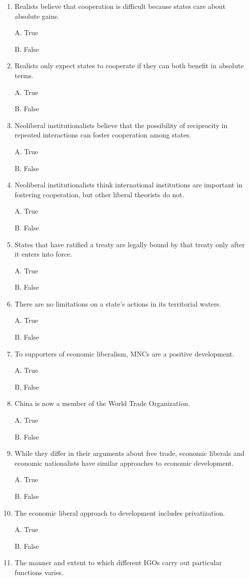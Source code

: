 \documentclass[
]{book}
\begin{document}
\begin{enumerate}
\def\labelenumi{\arabic{enumi}.}
\item
  Realists believe that cooperation is difficult because states care about absolute gains.

  A. True

  B. False
\item
  Realists only expect states to cooperate if they can both benefit in absolute terms.

  A. True

  B. False
\item
  Neoliberal institutionalists believe that the possibility of reciprocity in repeated interactions can foster cooperation among states.

  A. True

  B. False
\item
  Neoliberal institutionalists think international institutions are important in fostering cooperation, but other liberal theorists do not.

  A. True

  B. False
\item
  States that have ratified a treaty are legally bound by that treaty only after it enters into force.

  A. True

  B. False
\item
  There are no limitations on a state's actions in its territorial waters.

  A. True

  B. False
\item
  To supporters of economic liberalism, MNCs are a positive development.

  A. True

  B. False
\item
  China is now a member of the World Trade Organization.

  A. True

  B. False
\item
  While they differ in their arguments about free trade, economic liberals and economic nationalists have similar approaches to economic development.

  A. True

  B. False
\item
  The economic liberal approach to development includes privatization.

  A. True

  B. False
\item
  The manner and extent to which different IGOs carry out particular functions varies.


\end{enumerate}
\end{document}
